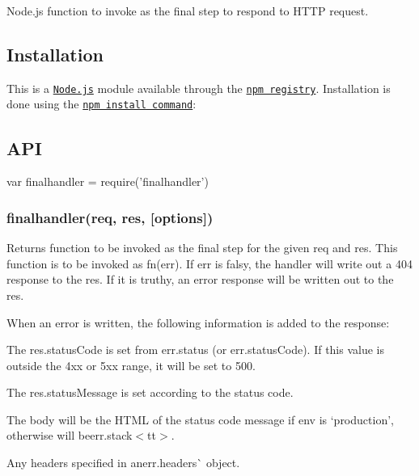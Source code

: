 \href{https://npmjs.org/package/finalhandler}{\tt } \href{https://npmjs.org/package/finalhandler}{\tt } \href{https://nodejs.org/en/download}{\tt } \href{https://travis-ci.org/pillarjs/finalhandler}{\tt } \href{https://coveralls.io/r/pillarjs/finalhandler?branch=master}{\tt }

Node.\+js function to invoke as the final step to respond to H\+T\+TP request.

\subsection*{Installation}

This is a \href{https://nodejs.org/en/}{\tt Node.\+js} module available through the \href{https://www.npmjs.com/}{\tt npm registry}. Installation is done using the \href{https://docs.npmjs.com/getting-started/installing-npm-packages-locally}{\tt {\ttfamily npm install} command}\+:




\subsection*{A\+PI}


\begin{DoxyCode}
var finalhandler = require('finalhandler')
\end{DoxyCode}


\subsubsection*{finalhandler(req, res, \mbox{[}options\mbox{]})}

Returns function to be invoked as the final step for the given {\ttfamily req} and {\ttfamily res}. This function is to be invoked as {\ttfamily fn(err)}. If {\ttfamily err} is falsy, the handler will write out a 404 response to the {\ttfamily res}. If it is truthy, an error response will be written out to the {\ttfamily res}.

When an error is written, the following information is added to the response\+:


\begin{DoxyItemize}
\item The {\ttfamily res.\+status\+Code} is set from {\ttfamily err.\+status} (or {\ttfamily err.\+status\+Code}). If this value is outside the 4xx or 5xx range, it will be set to 500.
\item The {\ttfamily res.\+status\+Message} is set according to the status code.
\item The body will be the H\+T\+ML of the status code message if {\ttfamily env} is `\textquotesingle{}production'{\ttfamily , otherwise will be}err.\+stack$<$tt$>$.
\item Any headers specified in anerr.\+headers\`{} object.
\end{DoxyItemize}

